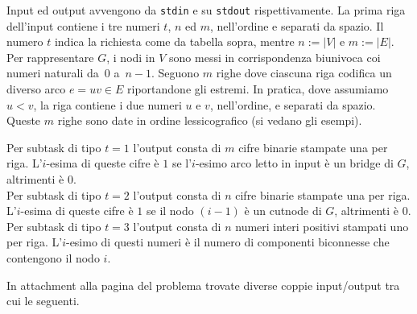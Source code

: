 
Input ed output avvengono da \verb'stdin' e su \verb'stdout' rispettivamente.
La prima riga dell'input contiene i tre numeri $t$, $n$ ed $m$, nell'ordine e separati da spazio. Il numero $t$ indica la richiesta come da tabella sopra, mentre $n:=|V|$ e $m:=|E|$. Per rappresentare $G$, i nodi in $V$ sono messi in corrispondenza biunivoca coi numeri naturali da~$0$ a~$n-1$.
Seguono $m$ righe dove ciascuna riga codifica un diverso arco $e=uv\in E$ riportandone gli estremi. In pratica, dove assumiamo $u < v$, la riga contiene i due numeri $u$ e $v$, nell'ordine, e separati da spazio.
Queste $m$ righe sono date in ordine lessicografico (si vedano gli esempi).

\indent
Per subtask di tipo $t=1$ l'output consta di $m$ cifre binarie stampate una per riga. L'$i$-esima di queste cifre è $1$ se l'$i$-esimo arco letto in input è un bridge di $G$, altrimenti è $0$.\\
\indent
Per subtask di tipo $t=2$ l'output consta di $n$ cifre binarie stampate una per riga. L'$i$-esima di queste cifre è $1$ se il nodo $(i-1)$ è un cutnode di $G$, altrimenti è $0$.\\
\indent
Per subtask di tipo $t=3$ l'output consta di $n$ numeri interi positivi stampati uno per riga. L'$i$-esimo di questi numeri è il numero di componenti biconnesse che contengono il nodo $i$. 



In attachment alla pagina del problema trovate diverse coppie input/output tra cui le seguenti.

\vspace{0.5cm}

